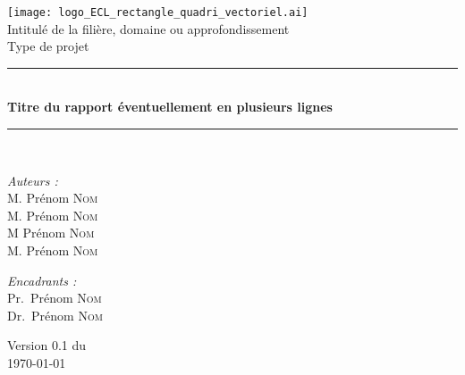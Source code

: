 \documentclass[a4paper,12pt,french]{article}
\begin{document}

\begin{titlepage}
\begin{center}

\texttt{[image: logo\_ECL\_rectangle\_quadri\_vectoriel.ai]}\\[1cm]

{\large Intitulé de la filière, domaine ou approfondissement}\\[0.5cm]

{\large Type de projet}\\[0.5cm]

\rule{\linewidth}{0.5mm} \\[0.4cm]
{ \huge \bfseries Titre du rapport éventuellement en plusieurs lignes \\[0.4cm] }
\rule{\linewidth}{0.5mm} \\[1.5cm]

\noindent
\begin{minipage}{0.4\textwidth}
  \begin{flushleft} \large
    \emph{Auteurs :}\\
    M. Prénom \textsc{Nom}\\
    M. Prénom \textsc{Nom}\\
    M Prénom \textsc{Nom}\\
    M. Prénom \textsc{Nom}
  \end{flushleft}
\end{minipage}%
\begin{minipage}{0.4\textwidth}
  \begin{flushright} \large
    \emph{Encadrants :} \\
    Pr.~Prénom \textsc{Nom}\\
    Dr.~Prénom \textsc{Nom}
  \end{flushright}
\end{minipage}

\vfill

{\large Version 0.1 du\\ \today}

\end{center}
\end{titlepage}

\end{document}
